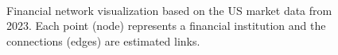 \documentclass[12pt]{article}
\begin{document}
\begin{figure}[!htbp]
	\centering
	\quad
	\\
	
	
	\caption{Financial network visualization based on the US market data from 2023. Each point (node) represents a financial institution and the connections (edges) are estimated links.}	\label{fig:actual_network}
\end{figure}
\end{document}
